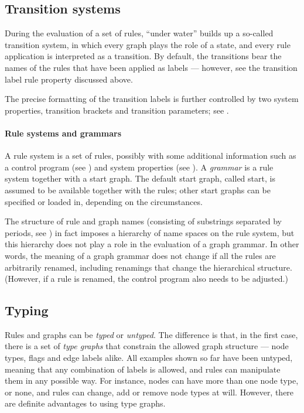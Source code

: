 \subsection{Transition systems}

During the evaluation of a set of rules, \GROOVE{} ``under water'' builds up a
so-called transition system, in which every graph plays the role of a state,
and every rule application is interpreted as a transition. By default, the
transitions bear the names of the rules that have been applied as
labels --- however, see the \textsf{transition label} rule property discussed
above.

The precise formatting of the transition labels is further controlled by two
system properties, \textsf{transition brackets} and
\textsf{transition parameters}; see .

\paragraph{Rule systems and grammars}

A rule system is a set of rules, possibly with some additional information such
as a control program (see ) and system properties (see
). A \emph{grammar} is a rule system together with a
start graph. The default start graph, called \textsf{start}, is assumed to be
available together with the rules; other start graphs can be specified or
loaded in, depending on the circumstances.

The structure of rule and graph names (consisting of substrings separated by
periods, see ) in fact imposes a hierarchy of name spaces on the
rule system, but this hierarchy does not play a role in the evaluation of a
graph grammar.  In other words, the meaning of a graph grammar does not change
if all the rules are arbitrarily renamed, including renamings that change the
hierarchical structure. (However, if a rule is renamed, the control program
also needs to be adjusted.)

\subsection{Typing}

Rules and graphs can be \emph{typed} or \emph{untyped}. The difference is that,
in the first case, there is a set of \emph{type graphs} that constrain the
allowed graph structure --- node types, flags and edge labels alike. All
examples shown so far have been untyped, meaning that any combination of labels
is allowed, and rules can manipulate them in any possible way. For instance,
nodes can have more than one node type, or none, and rules can change, add or
remove node types at will. However, there are definite advantages to using type
graphs.

